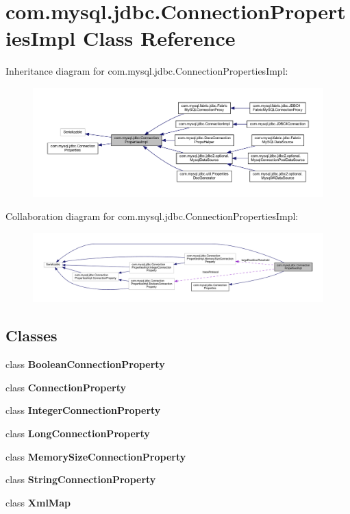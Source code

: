 \hypertarget{classcom_1_1mysql_1_1jdbc_1_1_connection_properties_impl}{}\section{com.\+mysql.\+jdbc.\+Connection\+Properties\+Impl Class Reference}
\label{classcom_1_1mysql_1_1jdbc_1_1_connection_properties_impl}


Inheritance diagram for com.\+mysql.\+jdbc.\+Connection\+Properties\+Impl\+:\nopagebreak
\begin{figure}[H]
\begin{center}
\leavevmode
\includegraphics[width=350pt]{classcom_1_1mysql_1_1jdbc_1_1_connection_properties_impl__inherit__graph}
\end{center}
\end{figure}


Collaboration diagram for com.\+mysql.\+jdbc.\+Connection\+Properties\+Impl\+:\nopagebreak
\begin{figure}[H]
\begin{center}
\leavevmode
\includegraphics[width=350pt]{classcom_1_1mysql_1_1jdbc_1_1_connection_properties_impl__coll__graph}
\end{center}
\end{figure}
\subsection*{Classes}
\begin{DoxyCompactItemize}
\item 
class {\bfseries Boolean\+Connection\+Property}
\item 
class {\bfseries Connection\+Property}
\item 
class {\bfseries Integer\+Connection\+Property}
\item 
class {\bfseries Long\+Connection\+Property}
\item 
class {\bfseries Memory\+Size\+Connection\+Property}
\item 
class {\bfseries String\+Connection\+Property}
\item 
class {\bfseries Xml\+Map}
\end{DoxyCompactItemize}
